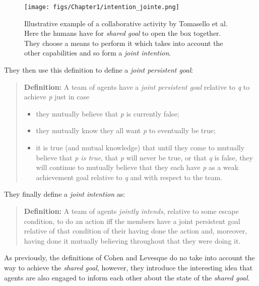 \documentclass[english,a4paper,11pt,twoside]{StyleThese}
\begin{document}
\begin{figure}[!h]
	\centering
    \texttt{[image: figs/Chapter1/intention\_jointe.png]}
    \caption{Illustrative example of a collaborative activity by Tomasello et al. Here the humans have for \textit{shared goal} to open the box together. They choose a means to perform it which takes into account the other capabilities and so form a \textit{joint intention}.}
    \label{fig:intention_jointe}
\end{figure}

They then use this definition to define a \textit{joint persistent goal}:
\begin{quote}
\textbf{Definition: } A team of agents have a \textit{joint persistent goal} relative to \textit{q} to achieve \textit{p} just in case
\begin{itemize}
\item they mutually believe that \textit{p} is currently false;
\item they mutually know they all want \textit{p} to eventually be true;
\item it is true (and mutual knowledge) that until they come to mutually believe that \textit{p is true}, that \textit{p} will never be true, or that \textit{q} is false, they will continue to mutually believe that they each have \textit{p} as a weak achievement goal relative to \textit{q} and with respect to the team.
\end{itemize}
\end{quote}

They finally define a \textit{joint intention} as:
\begin{quote}
\textbf{Definition:} A team of agents \textit{jointly intends}, relative to some escape condition, to do an action iff the members have a joint persistent goal relative of that condition of their having done the action and, moreover, having done it mutually believing throughout that they were doing it.
\end{quote}

As previously, the definitions of Cohen and Levesque do no take into account the way to achieve the \textit{shared goal}, however, they introduce the interesting idea that agents are also engaged to inform each other about the state of the \textit{shared goal}.
\end{document}

